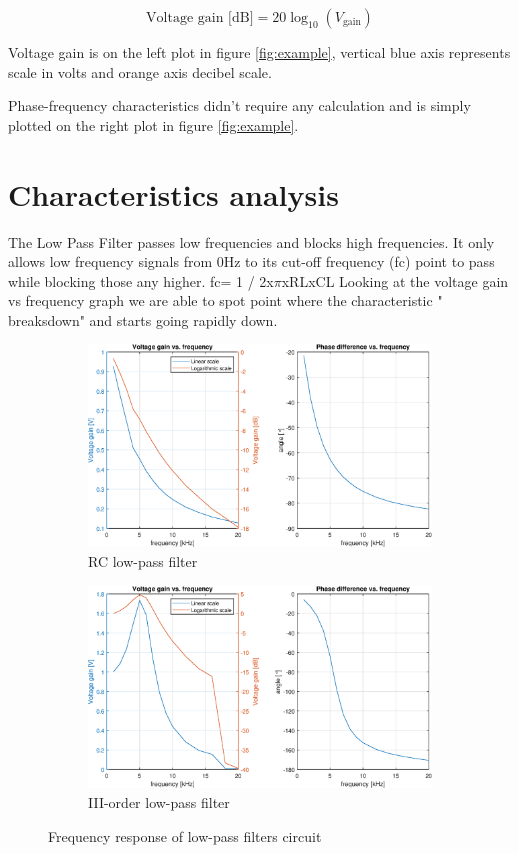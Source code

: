 \documentclass[notitlepage, a4paper, 11pt]{article}
\begin{document}
	\begin{equation}
		\text{Voltage gain [dB]} = 20 \log_{10}(V_{\text{gain}})
	\end{equation}
	
	Voltage gain is on the left plot in figure \ref{fig:example}, vertical blue axis represents scale in volts and orange axis decibel scale.
	
	Phase-frequency characteristics didn't require any calculation and is simply plotted on the right plot in figure \ref{fig:example}.
	
	\section{Characteristics analysis}
	
	The Low Pass Filter passes low frequencies and blocks high frequencies.
	It only allows low frequency signals from 0Hz to its cut-off frequency (fc) point to pass while blocking those any higher.  fc= 1 / 2x$\pi$xRLxCL 
	Looking at the voltage gain vs frequency graph we are able to spot point where the characteristic " breaksdown" and starts going rapidly down.
	
	\begin{figure}[H]
	\centering
	\begin{subfigure}{0.49\textwidth}
		\includegraphics[width=\textwidth]{../Matlab/img/11.eps}
		\caption{RC low-pass filter}
	\end{subfigure}
	\hfill
	\begin{subfigure}{0.49\textwidth}
		\includegraphics[width=\textwidth]{../Matlab/img/12.eps}
		\caption{III-order low-pass filter}
	\end{subfigure}
	\caption{Frequency response of low-pass filters circuit}
	\end{figure}
	
\end{document}
